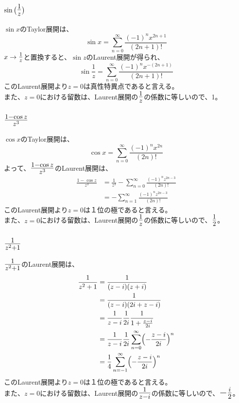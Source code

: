 \documentclass[dvipdfmx,a4paper]{jsarticle}
\begin{document}
\subsection{}
\subsubsection{$\sin{\bigl(\mbox{\Large$\frac{1}{z}$}\bigr)}$}
$\sin{x}$のTaylor展開は、
$$
\sin{x} = \sum^{\infty}_{n = 0}\frac{(-1)^n x^{2n+1}}{(2n + 1)!}
$$
$x \to \mbox{\large $\frac{1}{z}$}$と置換すると、$\sin{z}$のLaurent展開が得られ、
$$
\sin{\frac{1}{z}} = \sum^{\infty}_{n = 0}\frac{(-1)^n x^{-(2n+1)}}{(2n + 1)!}
$$
このLaurent展開より$z=0$は真性特異点であると言える。\\
また、$z =0$における留数は、Laurent展開の$\mbox{\Large$\frac{1}{z}$}$の係数に等しいので、1。\\

\subsubsection{$\mbox{\Large$\frac{1- \cos{z}}{z^3}$}$}
$\cos{x}$のTaylor展開は、
$$
\cos{x} = \sum^{\infty}_{n = 0}\frac{(-1)^n x^{2n}}{(2n)!}
$$
よって、$\mbox{\Large$\frac{1- \cos{z}}{z^3}$}$のLaurent展開は、
\begin{align*}
\frac{1- \cos{z}}{z^3} &= \frac{1}{z^3} - \sum^{\infty}_{n = 0}\frac{(-1)^n z^{2n-3}}{(2n)!}\\
&= -\sum^{\infty}_{n = 1}\frac{(-1)^n z^{2n-3}}{(2n)!}
\end{align*}
このLaurent展開より$z=0$は１位の極であると言える。\\
また、$z =0$における留数は、Laurent展開の$\mbox{\Large$\frac{1}{z}$}$の係数に等しいので、$\mbox{\Large$\frac{1}{2}$}$。\\

\subsubsection{$\mbox{\Large$\frac{1}{z^2+1}$}$}
$\mbox{\Large$\frac{1}{z^2+1}$}$のLaurent展開は、
\begin{align*}
\frac{1}{z^2+1} &= \frac{1}{(z-i)(z+i)}\\
&= \frac{1}{(z-i)(2i + z-i)}\\
&= \frac{1}{z-i}\frac{1}{2i}\frac{1}{1 + \frac{z-i}{2i}}\\
&= \frac{1}{z-i}\frac{1}{2i} \sum^{\infty}_{n=0}\Bigl(-\frac{z-i}{2i}\Bigr)^n\\
&= \frac{1}{4}\sum^{\infty}_{n=-1}\Bigl(-\frac{z-i}{2i}\Bigr)^n
\end{align*}
このLaurent展開より$z=0$は１位の極であると言える。\\
また、$z =0$における留数は、Laurent展開の$\mbox{\Large$\frac{1}{z-i}$}$の係数に等しいので、$\mbox{\Large$-\frac{i}{2}$}$。\\
\end{document}
